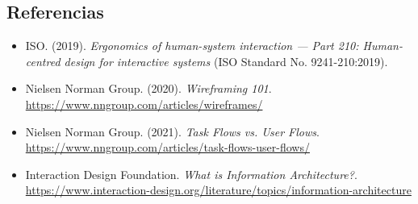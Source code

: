 \documentclass{article}
\begin{document}
\subsection{Referencias}
\begin{itemize}[leftmargin=1.5em, itemsep=4pt]
    \item ISO. (2019). \textit{Ergonomics of human-system interaction --- Part 210: Human-centred design for interactive systems} (ISO Standard No. 9241-210:2019).
    \item Nielsen Norman Group. (2020). \textit{Wireframing 101}. \url{https://www.nngroup.com/articles/wireframes/}
    \item Nielsen Norman Group. (2021). \textit{Task Flows vs. User Flows}. \url{https://www.nngroup.com/articles/task-flows-user-flows/}
    \item Interaction Design Foundation. \textit{What is Information Architecture?}. \url{https://www.interaction-design.org/literature/topics/information-architecture}
\end{itemize}
\end{document}
